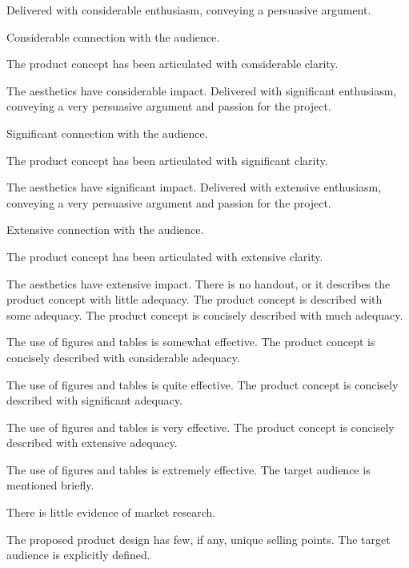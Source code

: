 \documentclass{../../fal_assignment}
\begin{document}
\begin{markingrubric}
        \grade Delivered with considerable enthusiasm, conveying a persuasive argument. 
            \par Considerable connection with the audience.
            \par The product concept has been articulated with considerable clarity.
            \par The aesthetics have considerable impact.
        \grade Delivered with significant enthusiasm, conveying a very persuasive argument and passion for the project.
            \par Significant connection with the audience.
            \par The product concept has been articulated with significant clarity.
            \par The aesthetics have significant impact.
        \grade Delivered with extensive enthusiasm, conveying a very persuasive argument and passion for the project.
            \par Extensive connection with the audience.
            \par The product concept has been articulated with extensive clarity.
            \par The aesthetics have extensive impact.
%
        \grade\fail There is no handout, or it describes the product concept with little adequacy.
        \grade The product concept is described with some adequacy.
        \grade The product concept is concisely described with much adequacy.
            \par The use of figures and tables is somewhat effective.
        \grade The product concept is concisely described with considerable adequacy.
            \par The use of figures and tables is quite effective.
        \grade The product concept is concisely described with significant adequacy.
            \par The use of figures and tables is very effective.
        \grade The product concept is concisely described with extensive adequacy.
            \par The use of figures and tables is extremely effective.
%
        \grade \fail The target audience is mentioned briefly.
            \par There is little evidence of market research.
            \par The proposed product design has few, if any, unique selling points.
        \grade The target audience is explicitly defined.

\end{markingrubric}
\end{document}
